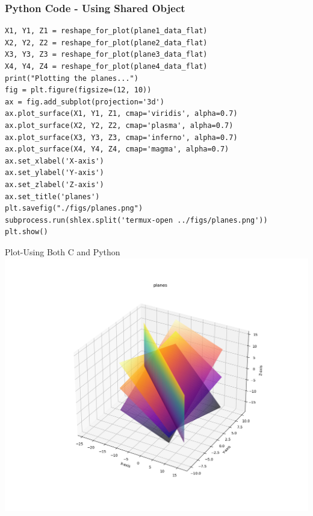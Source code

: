 \documentclass{beamer}
\begin{document}
\begin{frame}[fragile]
    \frametitle{Python Code - Using Shared Object}
    \begin{lstlisting}
X1, Y1, Z1 = reshape_for_plot(plane1_data_flat)
X2, Y2, Z2 = reshape_for_plot(plane2_data_flat)
X3, Y3, Z3 = reshape_for_plot(plane3_data_flat)
X4, Y4, Z4 = reshape_for_plot(plane4_data_flat)
print("Plotting the planes...")
fig = plt.figure(figsize=(12, 10))
ax = fig.add_subplot(projection='3d')
ax.plot_surface(X1, Y1, Z1, cmap='viridis', alpha=0.7)
ax.plot_surface(X2, Y2, Z2, cmap='plasma', alpha=0.7)
ax.plot_surface(X3, Y3, Z3, cmap='inferno', alpha=0.7)
ax.plot_surface(X4, Y4, Z4, cmap='magma', alpha=0.7)
ax.set_xlabel('X-axis')
ax.set_ylabel('Y-axis')
ax.set_zlabel('Z-axis')
ax.set_title('planes')
plt.savefig("./figs/planes.png")
subprocess.run(shlex.split('termux-open ../figs/planes.png'))
plt.show()

\end{lstlisting}
\end{frame}


\begin{frame}{Plot-Using Both C and Python}
    \centering
    \includegraphics[width=\columnwidth, height=0.8\textheight, keepaspectratio]{figs/planes.png}     
\end{frame}
\end{document}
